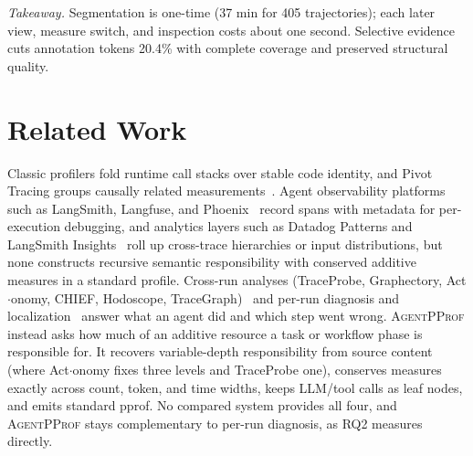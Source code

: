\documentclass[sigconf,nonacm]{acmart}
\newcommand{\sys}{\textsc{AgentPProf}\xspace}
\begin{document}
\emph{Takeaway.} Segmentation is one-time (37 min for 405 trajectories);
each later view, measure switch, and inspection costs about one second.
Selective evidence cuts annotation tokens 20.4\% with complete coverage
and preserved structural quality.

\section{Related Work}

Classic profilers fold runtime call stacks over stable code identity, and Pivot Tracing groups causally related measurements~\cite{pprof,flamegraphs,pivottracing}.
Agent observability platforms such as LangSmith, Langfuse, and Phoenix~\cite{langsmith,langfuse,phoenix} record spans with metadata for per-execution debugging, and analytics layers such as Datadog Patterns and LangSmith Insights~\cite{datadog-patterns,langsmith-insights} roll up cross-trace hierarchies or input distributions, but none constructs recursive semantic responsibility with conserved additive measures in a standard profile.
Cross-run analyses (TraceProbe, Graphectory, Act$\cdot$onomy, CHIEF, Hodoscope, TraceGraph)~\cite{traceprobe2026,graphectory2026,actonomy2026,chief2026,hodoscope2026,tracegraph2026} and per-run diagnosis and localization~\cite{agentrx,telbench,agentatlas,trajad,agentfixer,li2026codetracer,agentprocessbench,hintbench,traceelephant,mpbench2026} answer what an agent did and which step went wrong.
\sys instead asks how much of an additive resource a task or workflow phase is responsible for. It recovers variable-depth responsibility from source content (where Act$\cdot$onomy fixes three levels and TraceProbe one), conserves measures exactly across count, token, and time widths, keeps LLM/tool calls as leaf nodes, and emits standard pprof. No compared system provides all four, and \sys stays complementary to per-run diagnosis, as RQ2 measures directly.
\end{document}
